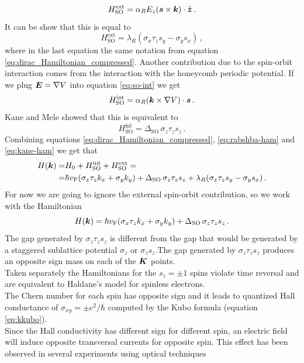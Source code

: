 \begin{equation}
    H_\textrm{SO}^\textrm{ext}=
    \alpha_R E_z(\boldsymbol{s} \times \boldsymbol{k})\cdot \hat{\boldsymbol{z}}\,.
\end{equation}
It can be show that this is equal to \cite{kane2005quantum} 
\begin{equation}
    H_\textrm{SO}^\textrm{ext}=
    \lambda_R (\sigma_x\tau_zs_y-\sigma_ys_x)
    \label{eq:rabshba-ham}\,,
\end{equation}
where in the last equation the same notation from equation \ref{eq:dirac_Hamiltonian_compressed}.
Another contribution due to the spin-orbit interaction comes from the interaction with the honeycomb periodic potential. If we plug $\boldsymbol{E}=\nabla V$ into equation \ref{eq:so-int} we get
\begin{equation}
    H_\textrm{SO}^\textrm{int}=\alpha_R(\boldsymbol{k}\times \nabla V)\cdot \boldsymbol{s}\,.
\end{equation}
Kane and Mele \cite{kane2005quantum} showed that this is equivalent to 
\begin{equation}
    H_\textrm{SO}^\textrm{int}=\Delta_\textrm{SO}\,\sigma_z\tau_zs_z\,.
    \label{eq:kane-ham}
\end{equation}
Combining equations \ref{eq:dirac_Hamiltonian_compressed}, \ref{eq:rabshba-ham} and \ref{eq:kane-ham} we get that
\begin{equation}
    \begin{split}
        H(\boldsymbol{k})=&H_0+H_\textrm{SO}^\textrm{int}+H_\textrm{SO}^\textrm{ext}=\\
        =&\hbar v_\textrm{F}(\sigma_x\tau_zk_x+\sigma_yk_y)+
        \Delta_\textrm{SO}\,\sigma_z\tau_zs_z +
        \lambda_R (\sigma_x\tau_zs_y-\sigma_ys_x)\,.
    \end{split}
\end{equation}
For now we are going to ignore the external spin-orbit contribution, so we work with the Hamiltonian
\begin{equation}
    H(\boldsymbol{k})=\hbar v_\textrm{F}(\sigma_x\tau_zk_x+\sigma_yk_y)+
    \Delta_\textrm{SO}\,\sigma_z\tau_zs_z\,.
\end{equation}
The gap generated by $\sigma_z\tau_zs_z$ is different from the gap that would be generated by a staggered sublattice potential $\sigma_z$ or $\sigma_zs_z$.The gap generated by $\sigma_z\tau_zs_z$ produces an opposite sign mass on each of the $\boldsymbol{K}$ points.\\
Taken separately the Hamiltonians for the $s_z=\pm 1$ spins violate time reversal and are equivalent to Haldane's model for spinless electrons.\\
The Chern number for each spin has opposite sign and it leads to quantized Hall conductance of $\sigma_{xy}=\pm e^2/\hbar$ computed by the Kubo formula (equation \ref{eq:kkubo}).\\
Since the Hall conductivity has different sign for different spin, an electric field will induce opposite transversal currents for opposite spin.
This effect has been observed in several experiments \cite{kato2004observation,wunderlich2005experimental,sih2006generating,stern2006current} using optical techniques

